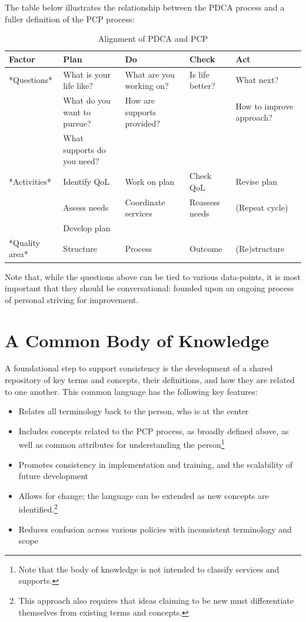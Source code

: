 \documentclass[
]{book}
\providecommand{\tightlist}{%
  \setlength{\itemsep}{0pt}\setlength{\parskip}{0pt}}
\begin{document}
The table below illustrates the relationship between the PDCA process and a fuller definition of the PCP process:

\begin{table}

\caption{\label{tab:unnamed-chunk-6}Alignment of PDCA and PCP}
\centering
\begin{tabular}[t]{l|l|l|l|l}
\hline
Factor & Plan & Do & Check & Act\\
\hline
*Questions* & What is your life like? & What are you working on? & Is life better? & What next?\\
\hline
 & What do you want to pursue? & How are supports provided? &  & How to improve approach?\\
\hline
 & What supports do you need? &  &  & \\
\hline
*Activities* & Identify QoL & Work on plan & Check QoL & Revise plan\\
\hline
 & Assess needs & Coordinate services & Reassess needs & (Repeat cycle)\\
\hline
 & Develop plan &  &  & \\
\hline
*Quality area* & Structure & Process & Outcome & (Re)structure\\
\hline
\end{tabular}
\end{table}

Note that, while the questions above can be tied to various data-points, it is most important that they should be conversational: founded upon an ongoing process of personal striving for improvement.

\hypertarget{bok}{%
\chapter{A Common Body of Knowledge}\label{bok}}

A foundational step to support consistency is the development of a shared repository of key terms and concepts, their definitions, and how they are related to one another. This common language has the following key features:

\begin{itemize}
\tightlist
\item
  Relates all terminology back to the person, who is at the center
\item
  Includes concepts related to the PCP process, as broadly defined above, as well as common attributes for understanding the person\footnote{Note that the body of knowledge is not intended to classify services and supports.}
\item
  Promotes consistency in implementation and training, and the scalability of future development
\item
  Allows for change; the language can be extended as new concepts are identified.\footnote{This approach also requires that ideas claiming to be new must differentiate themselves from existing terms and concepts.}
\item
  Reduces confusion across various policies with inconsistent terminology and scope
\end{itemize}
\end{document}
